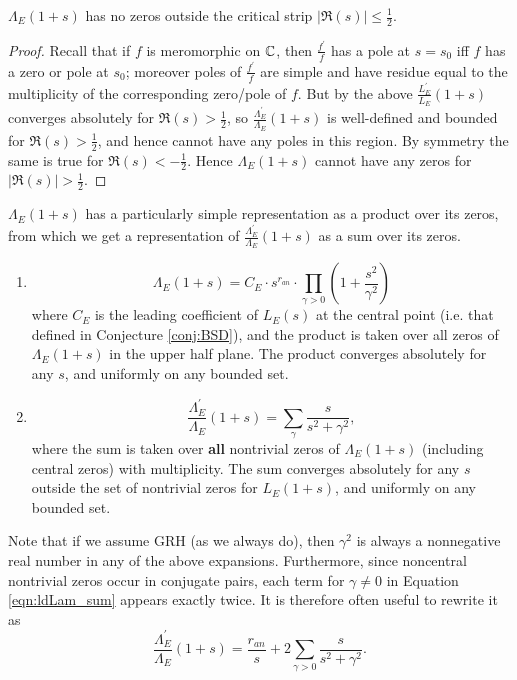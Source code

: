 \documentclass[10pt]{article}
\newcommand{\pr}{^{\prime}}
\newcommand{\Les}{L_E(s)}
\newcommand{\ldLe}[1]{\frac{L_E\pr}{L_E}\left(#1\right)}
\newcommand{\ldLam}[1]{\frac{\Lambda_E\pr}{\Lambda_E}\left(#1\right)}
\begin{document}
\begin{corollary}
$\Lambda_E(1+s)$ has no zeros outside the critical strip $|\Re(s)| \le \frac{1}{2}$.
\end{corollary}
\begin{proof}
Recall that if $f$ is meromorphic on $\mathbb{C}$, then $\frac{f\pr}{f}$ has a pole at $s=s_0$ iff $f$ has a zero or pole at $s_0$; moreover poles of $\frac{f\pr}{f}$ are simple and have residue equal to the multiplicity of the corresponding zero/pole of $f$. But by the above $\ldLe{1+s}$ converges absolutely for $\Re(s)>\frac{1}{2}$, so $\ldLam{1+s}$ is well-defined and bounded for $\Re(s)>\frac{1}{2}$, and hence cannot have any poles in this region. By symmetry the same is true for $\Re(s)<-\frac{1}{2}$. Hence $\Lambda_E(1+s)$ cannot have any zeros for $|\Re(s)| > \frac{1}{2}$.
\end{proof}

$\Lambda_E(1+s)$ has a particularly simple representation as a product over its zeros, from which we get a representation of $\ldLam{1+s}$ as a sum over its zeros.
\begin{lemma}  \mbox{}
\begin{enumerate}
\item \begin{equation}\label{eqn:Lams_prod}
\Lambda_E(1+s) = C_E\cdot s^{r_{an}} \cdot \prod_{\gamma > 0} \left(1+\frac{s^2}{\gamma^2}\right) 
\end{equation}
where $C_E$ is the leading coefficient of $\Les$ at the central point (i.e. that defined in Conjecture \ref{conj:BSD}), and the product is taken over all zeros of $\Lambda_E(1+s)$ in the upper half plane. The product converges absolutely for any $s$, and uniformly on any bounded set.
\item \begin{equation}\label{eqn:ldLam_sum}
\ldLam{1+s} = \sum_{\gamma} \frac{s}{s^2+\gamma^2}, 
\end{equation}
where the sum is taken over {\bf all} nontrivial zeros of $\Lambda_E(1+s)$ (including central zeros) with multiplicity. The sum converges absolutely for any $s$ outside the set of nontrivial zeros for $L_E(1+s)$, and uniformly on any bounded set. \\
\end{enumerate}
\end{lemma}

Note that if we assume GRH (as we always do), then $\gamma^2$ is always a nonnegative real number in any of the above expansions. Furthermore,  since noncentral nontrivial zeros occur in conjugate pairs, each term for $\gamma \ne 0$ in Equation \ref{eqn:ldLam_sum} appears exactly twice. It is therefore often useful to rewrite it as
\begin{equation}\label{eqn:ldLam_sum_v2}
\ldLam{1+s} = \frac{r_{an}}{s} + 2 \sum_{\gamma>0} \frac{s}{s^2+\gamma^2}.
\end{equation}
\end{document}

